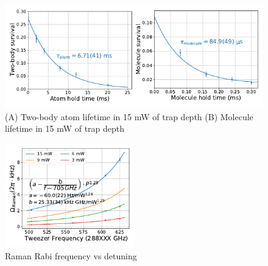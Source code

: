 \documentclass[aps,prl,twocolumn,groupedaddress]{revtex4-1}
\newcommand{\todo}[1]{}
\begin{document}
\begin{figure}
  \includegraphics[height=4.5cm]{fig3.pdf}
  \caption{
    (A) Two-body atom lifetime in 15 mW of trap depth \todo{lifetime number,
      subtraction of single body, photoassociation rate}
    (B) Molecule lifetime in 15 mW of trap depth \todo{lifetime number}
    \label{f-lifetime}}
\end{figure}

\begin{figure}
  \includegraphics[height=4.5cm]{fig4.pdf}
  \caption{Raman Rabi frequency vs detuning
    \label{f-det}}
\end{figure}






\end{document}
